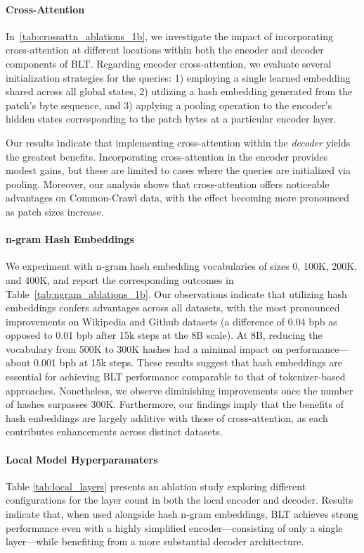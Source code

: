 \paragraph{Cross-Attention} 
In~\autoref{tab:crossattn_ablations_1b}, we investigate the impact of incorporating cross-attention at different locations within both the encoder and decoder components of {\textsc BLT}. Regarding encoder cross-attention, we evaluate several initialization strategies for the queries: 1) employing a single learned embedding shared across all global states, 2) utilizing a hash embedding generated from the patch’s byte sequence, and 3) applying a pooling operation to the encoder’s hidden states corresponding to the patch bytes at a particular encoder layer.

Our results indicate that implementing cross-attention within the \textit{decoder} yields the greatest benefits. Incorporating cross-attention in the encoder provides modest gains, but these are limited to cases where the queries are initialized via pooling. Moreover, our analysis shows that cross-attention offers noticeable advantages on Common-Crawl data, with the effect becoming more pronounced as patch sizes increase.

\paragraph{n-gram Hash Embeddings} 

We experiment with n-gram hash embedding vocabularies of sizes 0, 100K, 200K, and 400K, and report the corresponding outcomes in Table~\ref{tab:ngram_ablations_1b}. Our observations indicate that utilizing hash embeddings confers advantages across all datasets, with the most pronounced improvements on Wikipedia and Github datasets (a difference of 0.04 bpb as opposed to 0.01 bpb after 15k steps at the 8B scale). At 8B, reducing the vocabulary from 500K to 300K hashes had a minimal impact on performance—about 0.001 bpb at 15k steps. These results suggest that hash embeddings are essential for achieving {\textsc BLT} performance comparable to that of tokenizer-based approaches. Nonetheless, we observe diminishing improvements once the number of hashes surpasses 300K. Furthermore, our findings imply that the benefits of hash embeddings are largely additive with those of cross-attention, as each contributes enhancements across distinct datasets.

\paragraph{Local Model Hyperparamaters} Table \ref{tab:local_layers} presents an ablation study exploring different configurations for the layer count in both the local encoder and decoder. Results indicate that, when used alongside hash n-gram embeddings, {\textsc BLT} achieves strong performance even with a highly simplified encoder—consisting of only a single layer—while benefiting from a more substantial decoder architecture.


